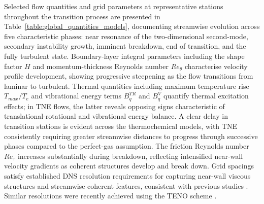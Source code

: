 Selected flow quantities and grid parameters at representative stations throughout the transition process are presented in Table~\ref{table:global_quantities_models}, documenting streamwise evolution across five characteristic phases: near resonance of the two-dimensional second-mode, secondary instability growth, imminent breakdown, end of transition, and the fully turbulent state. Boundary-layer integral parameters including the shape factor $H$ and momentum-thickness Reynolds number $Re_\theta$ characterise velocity profile development, showing progressive steepening as the flow transitions from laminar to turbulent. Thermal quantities including maximum temperature rise $T_{max}/T_e$ and vibrational energy terms $B_q^{TR}$ and $B_q^{V}$ quantify thermal excitation effects; in TNE flows, the latter reveals opposing signs characteristic of translational-rotational and vibrational energy balance. A clear delay in transition stations is evident across the thermochemical models, with TNE consistently requiring greater streamwise distances to progress through successive phases compared to the perfect-gas assumption. The friction Reynolds number $Re_\tau$ increases substantially during breakdown, reflecting intensified near-wall velocity gradients as coherent structures develop and break down. Grid spacings satisfy established DNS resolution requirements for capturing near-wall viscous structures and streamwise coherent features, consistent with previous studies \citep{PoggieEtAl2015}. Similar resolutions were recently achieved using the TENO scheme \citep{Williamsetal2025}.

